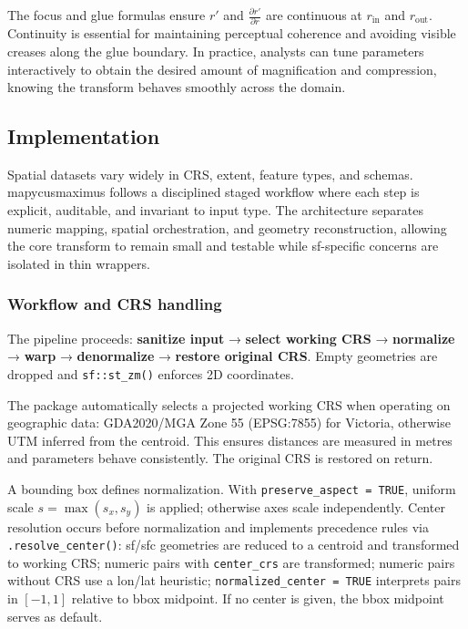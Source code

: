 The focus and glue formulas ensure \(r'\) and \(\frac{\partial r'}{\partial r}\) are continuous at
\(r_{\text{in}}\) and \(r_{\text{out}}\). Continuity is essential for maintaining perceptual
coherence and avoiding visible creases along the glue boundary. In practice, analysts can tune
parameters interactively to obtain the desired amount of magnification and compression, knowing the
transform behaves smoothly across the domain.

\hypertarget{implementation}{%
\subsection{Implementation}\label{implementation}}

Spatial datasets vary widely in CRS, extent, feature types, and schemas. mapycusmaximus follows a disciplined staged workflow where each step is explicit, auditable, and invariant to input type. The architecture separates numeric mapping, spatial orchestration, and geometry reconstruction, allowing the core transform to remain small and testable while sf-specific concerns are isolated in thin wrappers.

\hypertarget{workflow-and-crs-handling}{%
\subsubsection{Workflow and CRS handling}\label{workflow-and-crs-handling}}

The pipeline proceeds: \textbf{sanitize input} → \textbf{select working CRS} → \textbf{normalize} → \textbf{warp} → \textbf{denormalize} → \textbf{restore original CRS}. Empty geometries are dropped and \texttt{sf::st\_zm()} enforces 2D coordinates.

The package automatically selects a projected working CRS when operating on geographic data: GDA2020/MGA Zone 55 (EPSG:7855) for Victoria, otherwise UTM inferred from the centroid. This ensures distances are measured in metres and parameters behave consistently. The original CRS is restored on return.

A bounding box defines normalization. With \texttt{preserve\_aspect\ =\ TRUE}, uniform scale \(s = \max(s_x, s_y)\) is applied; otherwise axes scale independently. Center resolution occurs before normalization and implements precedence rules via \texttt{.resolve\_center()}: sf/sfc geometries are reduced to a centroid and transformed to working CRS; numeric pairs with \texttt{center\_crs} are transformed; numeric pairs without CRS use a lon/lat heuristic; \texttt{normalized\_center\ =\ TRUE} interprets pairs in \([-1, 1]\) relative to bbox midpoint. If no center is given, the bbox midpoint serves as default.


